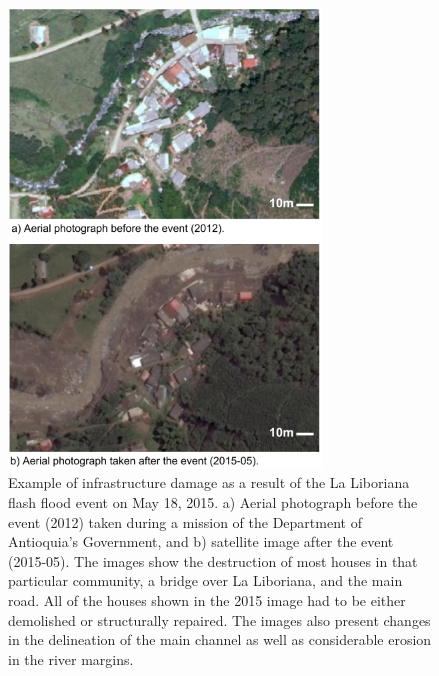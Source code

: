 \documentclass[hess, manuscript]{copernicus}
\begin{document}
\begin{figure}[t]
    \centering
    \includegraphics[width=8.3cm]{Figures/Salgar_Before_After.png}
    \caption{Example of infrastructure damage as a result of the La Liboriana flash flood event on May 18, 2015. a) Aerial photograph before the event (2012) taken during a mission of the Department of Antioquia's Government, and b) satellite image after the event (2015-05). The images show the destruction of most houses in that particular community, a bridge over La Liboriana, and the main road. All of the houses shown in the 2015 image had to be either demolished or structurally repaired. The images also present changes in the delineation of the main channel as well as considerable erosion in the river margins.}
    \label{fig:Antes_y_Despues}
\end{figure}
\end{document}
